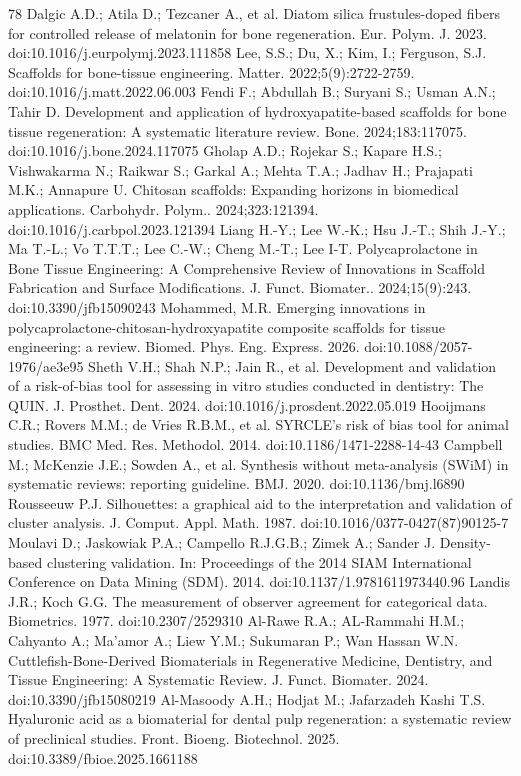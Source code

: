 \documentclass[5p,times,twocolumn]{elsarticle}
\begin{document}
\begin{thebibliography}{78}
 Dalgic A.D.; Atila D.; Tezcaner A., et al. Diatom silica frustules-doped fibers for controlled release of melatonin for bone regeneration. Eur. Polym. J. 2023. doi:10.1016/j.eurpolymj.2023.111858
 Lee, S.S.; Du, X.; Kim, I.; Ferguson, S.J. Scaffolds for bone-tissue engineering. Matter. 2022;5(9):2722-2759. doi:10.1016/j.matt.2022.06.003
 Fendi F.; Abdullah B.; Suryani S.; Usman A.N.; Tahir D. Development and application of hydroxyapatite-based scaffolds for bone tissue regeneration: A systematic literature review. Bone. 2024;183:117075. doi:10.1016/j.bone.2024.117075
 Gholap A.D.; Rojekar S.; Kapare H.S.; Vishwakarma N.; Raikwar S.; Garkal A.; Mehta T.A.; Jadhav H.; Prajapati M.K.; Annapure U. Chitosan scaffolds: Expanding horizons in biomedical applications. Carbohydr. Polym.. 2024;323:121394. doi:10.1016/j.carbpol.2023.121394
 Liang H.-Y.; Lee W.-K.; Hsu J.-T.; Shih J.-Y.; Ma T.-L.; Vo T.T.T.; Lee C.-W.; Cheng M.-T.; Lee I-T. Polycaprolactone in Bone Tissue Engineering: A Comprehensive Review of Innovations in Scaffold Fabrication and Surface Modifications. J. Funct. Biomater.. 2024;15(9):243. doi:10.3390/jfb15090243
 Mohammed, M.R. Emerging innovations in polycaprolactone-chitosan-hydroxyapatite composite scaffolds for tissue engineering: a review. Biomed. Phys. Eng. Express. 2026. doi:10.1088/2057-1976/ae3e95
 Sheth V.H.; Shah N.P.; Jain R., et al. Development and validation of a risk-of-bias tool for assessing in vitro studies conducted in dentistry: The QUIN. J. Prosthet. Dent. 2024. doi:10.1016/j.prosdent.2022.05.019
 Hooijmans C.R.; Rovers M.M.; de Vries R.B.M., et al. SYRCLE's risk of bias tool for animal studies. BMC Med. Res. Methodol. 2014. doi:10.1186/1471-2288-14-43
 Campbell M.; McKenzie J.E.; Sowden A., et al. Synthesis without meta-analysis (SWiM) in systematic reviews: reporting guideline. BMJ. 2020. doi:10.1136/bmj.l6890
 Rousseeuw P.J. Silhouettes: a graphical aid to the interpretation and validation of cluster analysis. J. Comput. Appl. Math. 1987. doi:10.1016/0377-0427(87)90125-7
 Moulavi D.; Jaskowiak P.A.; Campello R.J.G.B.; Zimek A.; Sander J. Density-based clustering validation. In: Proceedings of the 2014 SIAM International Conference on Data Mining (SDM). 2014. doi:10.1137/1.9781611973440.96
 Landis J.R.; Koch G.G. The measurement of observer agreement for categorical data. Biometrics. 1977. doi:10.2307/2529310
 Al-Rawe R.A.; AL-Rammahi H.M.; Cahyanto A.; Ma'amor A.; Liew Y.M.; Sukumaran P.; Wan Hassan W.N. Cuttlefish-Bone-Derived Biomaterials in Regenerative Medicine, Dentistry, and Tissue Engineering: A Systematic Review. J. Funct. Biomater. 2024. doi:10.3390/jfb15080219
 Al-Masoody A.H.; Hodjat M.; Jafarzadeh Kashi T.S. Hyaluronic acid as a biomaterial for dental pulp regeneration: a systematic review of preclinical studies. Front. Bioeng. Biotechnol. 2025. doi:10.3389/fbioe.2025.1661188

\end{thebibliography}
\end{document}
